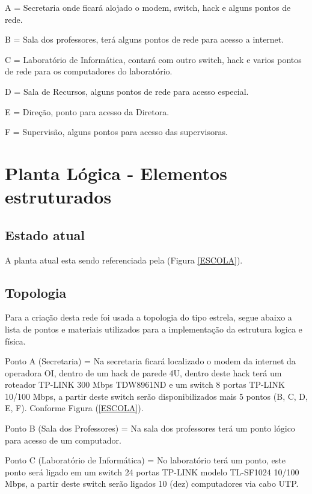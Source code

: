 \documentclass[	DIV=calc,%
							paper=a4,%
							fontsize=12pt,%
							onecolumn]{scrartcl}	 					%
\begin{document}
A = Secretaria onde ficará alojado o modem, switch, hack e alguns pontos de rede.

B = Sala dos professores, terá alguns pontos de rede para acesso a internet.

C = Laboratório de Informática, contará com outro switch, hack e varios pontos de rede para os computadores do laboratório.

D = Sala de Recursos, alguns pontos de rede para acesso especial.

E = Direção, ponto para acesso da Diretora.

F = Supervisão, alguns pontos para acesso das supervisoras.



\section{Planta Lógica - Elementos estruturados}

\subsection{Estado atual}
A planta atual esta sendo referenciada pela (Figura \ref{ESCOLA}).

\subsection{Topologia}
Para a criação desta rede foi usada a topologia do tipo estrela, segue abaixo a lista de pontos e materiais utilizados para a implementação da estrutura logica e física.

Ponto A (Secretaria) = Na secretaria ficará localizado o modem da internet da operadora OI, dentro de um hack de parede 4U, dentro deste hack terá um roteador TP-LINK 300 Mbps TDW8961ND e um switch 8 portas TP-LINK 10/100 Mbps, a partir deste switch serão disponibilizados mais 5 pontos (B, C, D, E, F). Conforme Figura (\ref{ESCOLA}).

Ponto B (Sala dos Professores) = Na sala dos professores terá um ponto lógico para acesso de um computador.

Ponto C (Laboratório de Informática) = No laboratório terá um ponto, este ponto será ligado em um switch 24 portas TP-LINK modelo TL-SF1024 10/100 Mbps, a partir deste switch serão ligados 10 (dez) computadores via cabo UTP.
\end{document}
